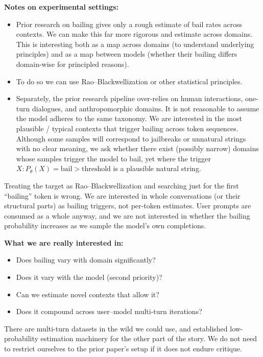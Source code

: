 \documentclass{article}
\begin{document}
\medskip\noindent\textbf{Notes on experimental settings:}
\begin{itemize}[leftmargin=*, itemsep=2pt]
    \item Prior research on bailing gives only a rough estimate of bail rates
    across contexts. We can make this far more rigorous and estimate across
    domains. This is interesting both as a map across domains (to understand
    underlying principles) and as a map between models (whether their bailing
    differs domain-wise for principled reasons).
    \item To do so we can use Rao--Blackwellization or other statistical
    principles.
    \item Separately, the prior research pipeline over-relies on human
    interactions, one-turn dialogues, and anthropomorphic domains. It is not
    reasonable to assume the model adheres to the same taxonomy. We are
    interested in the most plausible / typical contexts that trigger bailing
    across token sequences. Although some samples will correspond to
    jailbreaks or unnatural strings with no clear meaning, we ask whether
    there exist (possibly narrow) domains whose samples trigger the model to
    bail, yet where the trigger $X : P_\theta(X) = \text{bail} > \text{threshold}$
    is a plausible natural string.
\end{itemize}

Treating the target as Rao--Blackwellization and searching just for the first
``bailing'' token is wrong. We are interested in whole conversations (or their
structural parts) as bailing triggers, not per-token estimates. User prompts
are consumed as a whole anyway, and we are not interested in whether the
bailing probability increases as we sample the model's own completions.

\textbf{What we are really interested in:}
\begin{itemize}[leftmargin=*, itemsep=2pt]
    \item Does bailing vary with domain significantly?
    \item Does it vary with the model (second priority)?
    \item Can we estimate novel contexts that allow it?
    \item Does it compound across user--model multi-turn iterations?
\end{itemize}

There are multi-turn datasets in the wild we could use, and established
low-probability estimation machinery for the other part of the story. We do
not need to restrict ourselves to the prior paper's setup if it does not
endure critique.
\end{document}
